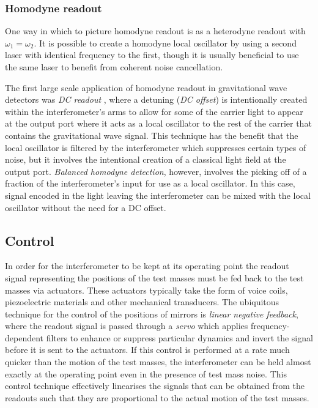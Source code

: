 \subsubsection{\label{sec:homodyne-readout}Homodyne readout}
One way in which to picture homodyne readout is as a heterodyne readout with $\omega_1 = \omega_2$. It is possible to create a homodyne local oscillator by using a second laser with identical frequency to the first, though it is usually beneficial to use the same laser to benefit from coherent noise cancellation.

The first large scale application of homodyne readout in gravitational wave detectors was \emph{\gls{DC} readout} \cite{Fricke2012}, where a detuning (\emph{\gls{DC} offset}) is intentionally created within the interferometer's arms to allow for some of the carrier light to appear at the output port where it acts as a local oscillator to the rest of the carrier that contains the gravitational wave signal. This technique has the benefit that the local oscillator is filtered by the interferometer which suppresses certain types of noise, but it involves the intentional creation of a classical light field at the output port. \emph{Balanced homodyne detection}, however, involves the picking off of a fraction of the interferometer's input for use as a local oscillator. In this case, signal encoded in the light leaving the interferometer can be mixed with the local oscillator without the need for a \gls{DC} offset.

\subsection{Control}
In order for the interferometer to be kept at its operating point the readout signal representing the positions of the test masses must be fed back to the test masses via actuators. These actuators typically take the form of voice coils, piezoelectric materials and other mechanical transducers. The ubiquitous technique for the control of the positions of mirrors is \emph{linear negative feedback}, where the readout signal is passed through a \emph{servo} which applies frequency-dependent filters to enhance or suppress particular dynamics and invert the signal before it is sent to the actuators. If this control is performed at a rate much quicker than the motion of the test masses, the interferometer can be held almost exactly at the operating point even in the presence of test mass noise. This control technique effectively linearises the signals that can be obtained from the readouts such that they are proportional to the actual motion of the test masses.

